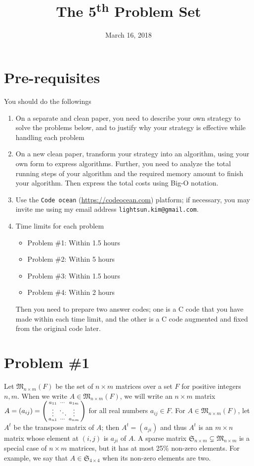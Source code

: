 \documentclass{article}
\date{March 16, 2018}
\title{The 5\textsuperscript{th} Problem Set}
\newcommand{\M}[2]{{\mathfrak{M}_{#1\times #2}}}
\newcommand{\sm}[2]{{\mathfrak{S}_{#1\times #2}}}
\newenvironment{psmallmatrix}
  {\left(\begin{smallmatrix}}
  {\end{smallmatrix}\right)}
\begin{document}
\maketitle
\section*{Pre-requisites}
You should do the followings
\begin{enumerate}
\item On a separate and clean paper,  you need to describe your own strategy to solve the problems below, and 
	to justify why your strategy is effective while handling each problem
\item On a new clean paper, transform your strategy into an algorithm, using your own form to express algorithms.
	Further, you need to analyze the total running steps of your algorithm and the required memory amount to finish your algorithm.
	Then express the total costs using Big-O notation.
\item Use the \texttt{Code ocean} (\url{https://codeocean.com}) platform; if necessary, you may invite me using my email address 
\texttt{lightsun.kim@gmail.com}.
\item Time limits for each problem
\begin{itemize}
\item Problem \#1: Within 1.5 hours
\item Problem \#2: Within 5 hours
\item Problem \#3: Within 1.5 hours
\item Problem \#4: Within 2 hours
\end{itemize}
Then you need to prepare two answer codes; one is a C code that you have made within each time limit, and the
other is a C code augmented and fixed from the original code later.
\end{enumerate}

\newpage

\section*{Problem \#1}


Let $\M{n}{m}(F)$ be the set of $n\times m$ matrices over a set $F$ for positive integers $n,m$. 
When we write $A\in\M{n}{m}(F)$, 
 we will write an $n\times m$ matrix  $A=(a_{ij})=
		\begin{psmallmatrix} 
				a_{11}&\cdots&a_{1m}\\ 
				\vdots & \ddots &\vdots\\
				a_{n1} & \cdots & a_{nm}
				\end{psmallmatrix}$ for all real numbers $a_{ij}\in F$.  
For $A\in\M{n}{m}(F)$, let $A^t$ be the transpose matrix of $A$; then $A^t=(a_{ji})$ and thus $A^t$ is an $m\times n$ 
matrix whose element at $(i,j)$ is $a_{ji}$ of $A$.		
A sparse matrix $\sm{n}{m}\subsetneq \M{n}{m}$ is a special case of $n\times m$ matrices, but
it has at most 25\% non-zero elements. For example,  we say that $A\in\sm{4}{4}$ when its non-zero elements are two.
\end{document}
